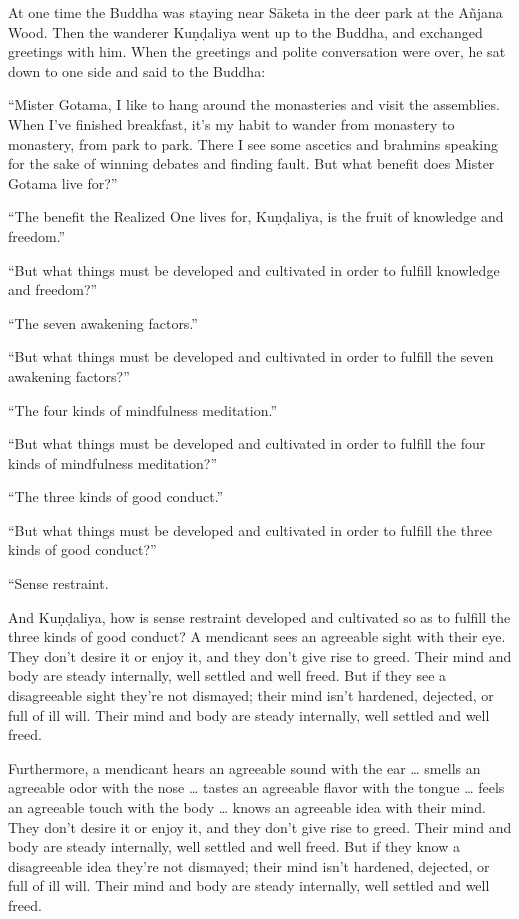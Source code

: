 \documentclass[12pt,openany]{book}%
\begin{document}
At one time the Buddha was staying near \textsanskrit{Sāketa} in the deer park at the \textsanskrit{Añjana} Wood. Then the wanderer \textsanskrit{Kuṇḍaliya} went up to the Buddha, and exchanged greetings with him. When the greetings and polite conversation were over, he sat down to one side and said to the Buddha: 

“Mister Gotama, I like to hang around the monasteries and visit the assemblies. When I’ve finished breakfast, it’s my habit to wander from monastery to monastery, from park to park. There I see some ascetics and brahmins speaking for the sake of winning debates and finding fault. But what benefit does Mister Gotama live for?” 

“The benefit the Realized One lives for, \textsanskrit{Kuṇḍaliya}, is the fruit of knowledge and freedom.” 

“But what things must be developed and cultivated in order to fulfill knowledge and freedom?” 

“The seven awakening factors.” 

“But what things must be developed and cultivated in order to fulfill the seven awakening factors?” 

“The four kinds of mindfulness meditation.” 

“But what things must be developed and cultivated in order to fulfill the four kinds of mindfulness meditation?” 

“The three kinds of good conduct.” 

“But what things must be developed and cultivated in order to fulfill the three kinds of good conduct?” 

“Sense restraint. 

And \textsanskrit{Kuṇḍaliya}, how is sense restraint developed and cultivated so as to fulfill the three kinds of good conduct? A mendicant sees an agreeable sight with their eye. They don’t desire it or enjoy it, and they don’t give rise to greed. Their mind and body are steady internally, well settled and well freed. But if they see a disagreeable sight they’re not dismayed; their mind isn’t hardened, dejected, or full of ill will. Their mind and body are steady internally, well settled and well freed. 

Furthermore, a mendicant hears an agreeable sound with the ear … smells an agreeable odor with the nose … tastes an agreeable flavor with the tongue … feels an agreeable touch with the body … knows an agreeable idea with their mind. They don’t desire it or enjoy it, and they don’t give rise to greed. Their mind and body are steady internally, well settled and well freed. But if they know a disagreeable idea they’re not dismayed; their mind isn’t hardened, dejected, or full of ill will. Their mind and body are steady internally, well settled and well freed. 
\end{document}

